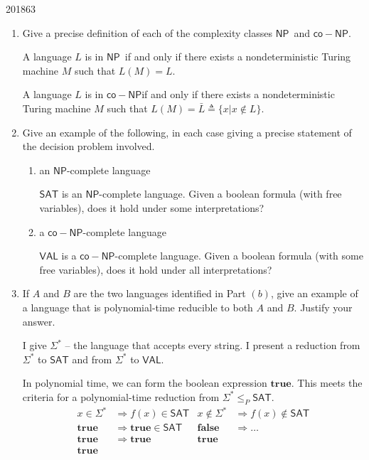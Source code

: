 \documentclass[10pt,\jkfside,a4paper]{article}
\newcommand{\NP}{\ensuremath{\mathsf{NP}}}
\newcommand{\coNP}{\ensuremath{\mathsf{co-NP}}}
\begin{document}
\begin{examquestion}{2018}{6}{3}

\begin{enumerate}[label=(\alph*)]

\item Give a precise definition of each of the complexity classes
\NP\ and \coNP.

A language $L$ is in \NP\ if and only if there exists a nondeterministic Turing
machine $M$ such that $L(M) = L$.

A language $L$ is in \coNP if and only if there exists a nondeterministic
Turing machine $M$ such that $L(M) = \bar L \triangleq \{x | x \notin L\}$.

\item Give an example of the following, in each case giving a precise
statement of the decision problem involved.

\begin{enumerate}[label=(\roman*)]

\item an \NP-complete language

$\mathsf{SAT}$ is an \NP-complete language. Given a boolean formula (with
free variables), does it hold under some interpretations?

\item a \coNP-complete language

$\mathsf{VAL}$ is a \coNP-complete language. Given a boolean formula (with
some free variables), does it hold under all interpretations?

\end{enumerate}

\item If $A$ and $B$ are the two languages identified in Part $(b)$, give an
example of a language that is polynomial-time reducible to both $A$ and $B$.
Justify your answer.

I give $\Sigma^*$ -- the language that accepts every string. I present a
reduction from $\Sigma^*$ to $\mathsf{SAT}$ and from $\Sigma^*$ to
$\mathsf{VAL}$.

In polynomial time, we can form the boolean expression $\mathbf{true}$. This
meets the criteria for a polynomial-time reduction from $\Sigma^*\le_P
\mathsf{SAT}$.
\begin{align*}
x \in \Sigma^* &\Longrightarrow f(x) \in \mathsf{SAT} &
x \notin \Sigma^* &\Longrightarrow f(x) \notin \mathsf{SAT} \\
\mathbf{true} &\Longrightarrow \mathbf{true} \in \mathsf{SAT} &
\mathbf{false} &\Longrightarrow \dots \\
\mathbf{true} &\Longrightarrow \mathbf{true} &
\mathbf{true} \\
\mathbf{true}
\end{align*}


\end{enumerate}
\end{examquestion}
\end{document}
